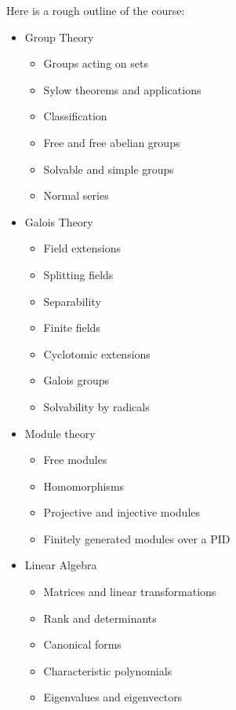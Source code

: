 Here is a rough outline of the course:

\begin{itemize}
\tightlist
\item
  Group Theory

  \begin{itemize}
  \tightlist
  \item
    Groups acting on sets
  \item
    Sylow theorems and applications
  \item
    Classification
  \item
    Free and free abelian groups
  \item
    Solvable and simple groups
  \item
    Normal series
  \end{itemize}
\item
  Galois Theory

  \begin{itemize}
  \tightlist
  \item
    Field extensions
  \item
    Splitting fields
  \item
    Separability
  \item
    Finite fields
  \item
    Cyclotomic extensions
  \item
    Galois groups
  \item
    Solvability by radicals
  \end{itemize}
\item
  Module theory

  \begin{itemize}
  \tightlist
  \item
    Free modules
  \item
    Homomorphisms
  \item
    Projective and injective modules
  \item
    Finitely generated modules over a PID
  \end{itemize}
\item
  Linear Algebra

  \begin{itemize}
  \tightlist
  \item
    Matrices and linear transformations
  \item
    Rank and determinants
  \item
    Canonical forms
  \item
    Characteristic polynomials
  \item
    Eigenvalues and eigenvectors
  \end{itemize}
\end{itemize}

